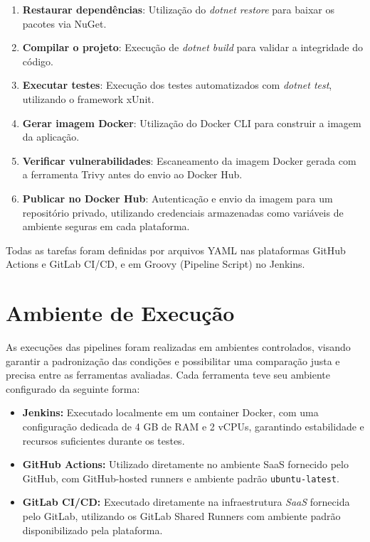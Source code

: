 \begin{enumerate}
    \item \textbf{Restaurar dependências}: Utilização do \textit{dotnet restore} para baixar os pacotes via NuGet.
    \item \textbf{Compilar o projeto}: Execução de \textit{dotnet build} para validar a integridade do código.
    \item \textbf{Executar testes}: Execução dos testes automatizados com \textit{dotnet test}, utilizando o framework xUnit.
    \item \textbf{Gerar imagem Docker}: Utilização do Docker CLI para construir a imagem da aplicação.
    \item \textbf{Verificar vulnerabilidades}: Escaneamento da imagem Docker gerada com a ferramenta Trivy antes do envio ao Docker Hub.
    \item \textbf{Publicar no Docker Hub}: Autenticação e envio da imagem para um repositório privado, utilizando credenciais armazenadas como variáveis de ambiente seguras em cada plataforma.
\end{enumerate}

Todas as tarefas foram definidas por arquivos YAML nas plataformas GitHub Actions e GitLab CI/CD, e em Groovy (Pipeline Script) no Jenkins.

\section{Ambiente de Execução}

As execuções das pipelines foram realizadas em ambientes controlados, visando garantir a padronização das condições e possibilitar uma comparação justa e precisa entre as ferramentas avaliadas. Cada ferramenta teve seu ambiente configurado da seguinte forma:

\begin{itemize}
    \item \textbf{Jenkins:} Executado localmente em um container Docker, com uma configuração dedicada de 4 GB de RAM e 2 vCPUs, garantindo estabilidade e recursos suficientes durante os testes.
    
    \item \textbf{GitHub Actions:} Utilizado diretamente no ambiente SaaS fornecido pelo GitHub, com GitHub-hosted runners e ambiente padrão \texttt{ubuntu-latest}.
    
    \item \textbf{GitLab CI/CD:} Executado diretamente na infraestrutura \textit{SaaS} fornecida pelo GitLab, utilizando os GitLab Shared Runners com ambiente padrão disponibilizado pela plataforma.
\end{itemize}

